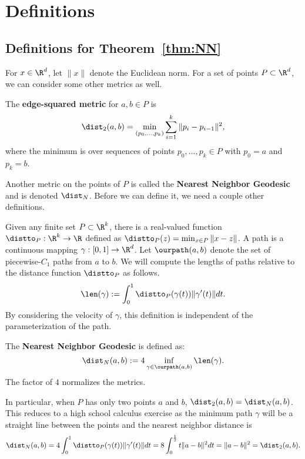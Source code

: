 
\section{Definitions} %
\label{sec:definitions}

\subsection{Definitions for Theorem~\ref{thm:NN}}
  For $x\in \R^d$, let $\|x\|$ denote the Euclidean norm.
  For a set of points $P\subset \R^d$, we can consider some other metrics as well.
  
  
  \begin{definition}
  The \textbf{edge-squared metric} for $a,b\in P$ is
  \[
    \dist_2(a,b) = \min_{(p_0,\ldots, p_k)}\sum_{i=1}^k \|p_i - p_{i-1}\|^2,
  \]
  where the minimum is over sequences of points $p_0,\ldots, p_k\in P$ with $p_0 = a$ and $p_k = b$.
  \end{definition}

  Another metric on the points of $P$ is called the \textbf{Nearest Neighbor Geodesic} and is denoted $\dist_N$.
  Before we can define it, we need a couple other definitions.

  Given any finite set $P\subset \R^k$, there is a real-valued function $\distto_P: \R^k\to \R$ defined as $\distto_P(z) = \min_{x\in P} \|x-z\|$.
  A path is a continuous mapping $\gamma:[0,1]\to \R^d$.
  Let $\ourpath(a,b)$ denote the set of piecewise-$C_1$ paths from $a$ to $b$.
  We will compute the lengths of paths relative to the distance function $\distto_P$ as follows.
  \[
    \len(\gamma) := \int_0^1 \distto_P(\gamma(t))\|\gamma'(t)\|dt.
  \]
  By considering the velocity of $\gamma$, this definition is
  independent of the parameterization of the path.
  \begin{definition}
    The \textbf{Nearest Neighbor Geodesic} is defined as:
  \[
    \dist_N(a,b) := 4 \inf_{\gamma\in \ourpath(a,b)}\len(\gamma).
  \]
  The factor of $4$ normalizes the metrics.
  \end{definition}
  In particular, when $P$ has only two points $a$ and $b$, $\dist_2(a,b) = \dist_N(a,b)$.
  This reduces to a high school calculus exercise as the minimum path $\gamma$ will be a straight line between the points and the nearest neighbor distance is
  \[
    \dist_N(a,b) = 4\int_0^1 \distto_P(\gamma(t))\|\gamma'(t)\|dt = 8\int_0^{\frac{1}{2}} t \|a - b\|^2 dt = \|a - b\|^2 = \dist_2(a,b).
  \]

